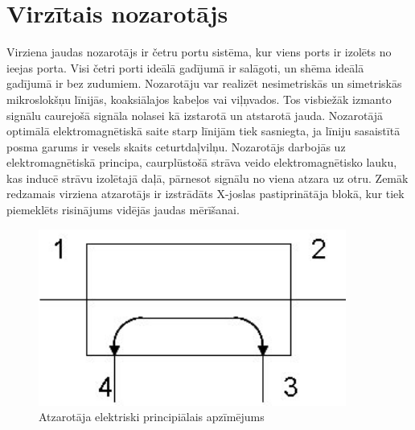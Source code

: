 \section{Virzītais nozarotājs}
Virziena jaudas nozarotājs ir četru portu sistēma, kur viens ports ir izolēts no ieejas porta. Visi četri porti ideālā gadījumā ir salāgoti, un shēma ideālā gadījumā ir bez zudumiem. Nozarotāju var realizēt nesimetriskās un simetriskās mikroslokšņu līnijās, koaksiālajos kabeļos vai viļņvados. Tos visbiežāk izmanto signālu caurejošā signāla nolasei kā izstarotā un atstarotā jauda. Nozarotājā optimālā elektromagnētiskā saite starp līnijām tiek sasniegta, ja līniju sasaistītā posma garums ir vesels skaits ceturtdaļvilņu. Nozarotājs darbojās uz elektromagnētiskā principa, caurplūstošā strāva veido elektromagnētisko lauku, kas inducē strāvu izolētajā daļā, pārnesot signālu no viena atzara uz otru. Zemāk redzamais virziena atzarotājs ir izstrādāts X-joslas pastiprinātāja blokā, kur tiek piemeklēts risinājums vidējās jaudas mērīšanai.
\begin{figure}[H]
	\centering
    \includegraphics[width=0.9\textwidth]{pictures/bi-directional_coupler.png}\hspace{1cm}
    \caption{Atzarotāja elektriski principiālais apzīmējums}
\end{figure}
